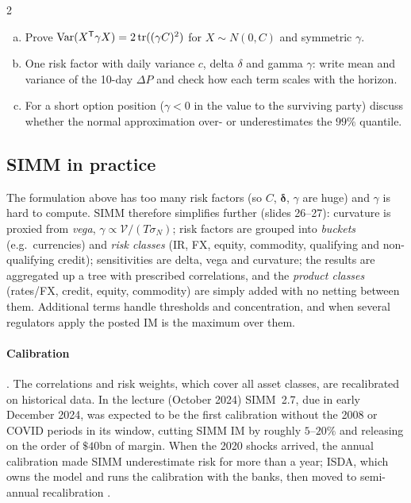 \begin{paracol}{2}
\begin{exercise}
\leavevmode
\begin{enumerate}[(a)]
  \item Prove $\operatorname{Var}(X^{\mathsf T}\gamma X)=2\operatorname{tr}((\gamma C)^2)$ for $X\sim N(0,C)$ and symmetric $\gamma$.
  \item One risk factor with
      daily variance $c$, delta $\delta$ and gamma $\gamma$: write mean and variance of the 10-day $\Delta P$ and check how each
      term scales with the horizon.
  \item For a short option position ($\gamma<0$ in the value to the surviving party) discuss
      whether the normal approximation over- or underestimates the $99\%$ quantile.
\end{enumerate}
\end{exercise}

\subsection{SIMM in practice}
The formulation above has too many risk factors (so $C$, $\bm\delta$, $\gamma$ are huge) and $\gamma$ is hard to
compute. SIMM therefore simplifies further (slides 26--27): curvature is proxied from \emph{vega},
$\gamma\propto\mathcal V/(T\sigma_N)$; risk factors are grouped into \emph{buckets} (e.g.\ currencies) and \emph{risk
classes} (IR, FX, equity, commodity, qualifying and non-qualifying credit); sensitivities are delta, vega and
curvature; the results are aggregated up a tree with prescribed correlations, and the \emph{product classes}
(rates/FX, credit, equity, commodity) are simply added with no netting between them. Additional terms handle
thresholds and concentration, and when several regulators apply the posted IM is the maximum over them.

\paragraph{Calibration} . The correlations and risk weights, which cover all asset classes, are
recalibrated on historical data. In the lecture (October 2024) SIMM~2.7, due in early December 2024, was expected to
be the first calibration without the 2008 or COVID periods in its window, cutting SIMM IM by roughly $5$--$20\%$
and releasing on the order of $\$40$bn of margin. When the 2020 shocks arrived, the annual calibration made SIMM
underestimate risk for more than a year; ISDA, which owns the model and runs the calibration with the banks, then
moved to semi-annual recalibration .


\end{paracol}
